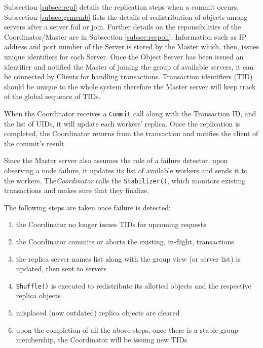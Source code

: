 \documentclass[times, 10pt,twocolumn]{article}
\begin{document}
Subsection \ref{subsec:repl} details the replication steps when a commit occurs, 
Subsection \ref{subsec:grmemb} lists the details of redistribution of objects among servers after a server fail or join. 
Further details on the reponsibilities of the Coordinator/Master are in Subsection \ref{subsec:respon}.
\label{subsec:repl}
Information such as IP address and port number of the Server is stored by the Master which, then, issues unique identifiers for each Server. 
Once the Object Server has been issued an identifier and notified the Master of joining the group of available servers, 
it can be connected by Clients for handling transactions. Transaction identifiers (TID) should be unique to the whole system 
therefore the Master server will keep track of the global sequence of TIDs.

When the Coordinator receives a \texttt{Commit} call along with the Transaction ID,
 and the list of UIDs, it will update each workers' replica. Once the replication is completed,
 the Coordinator returns from the transaction and notifies the client of the commit's result.

\label{subsec:grmemb}
Since the Master server also assumes the role of a failure detector,
 upon observing a node failure, it updates its list of available workers
 and sends it to the workers. The{\it Coordinator} calls the \texttt{Stabilizer()},
 which monitors existing transactions and makes sure that they finalize.

The following steps are taken once failure is detected: 
\begin{enumerate}
\item the Coordinator no longer issues TIDs for upcoming requests
\item the Coordinator commits or aborts the existing, in-flight, transactions
\item the replica server names list along with the group view (or server list) is updated, 
then sent to servers
\item \texttt{Shuffle()} is executed to redistribute its allotted objects and the respective replica objects 
\item misplaced (now outdated) replica objects are cleared
\item upon the completion of all the above steps, once there is a stable group membership, 
the Coordinator will be issuing new TIDs
\end{enumerate}
\end{document}
